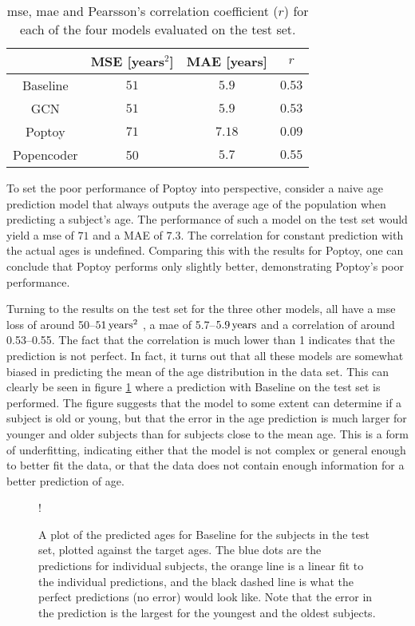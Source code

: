 \begin{table}[!htbp]
    \centering
    \caption{\acrfull{mse}, \acrfull{mae} and Pearsson's correlation coefficient ($r$) for each of the four models evaluated on the test set.}
    \begin{tabular}{c|c|c|c}
         &  MSE [years$^2$]& MAE [years] & $r$ \\ \hline 
        Baseline & $51 $& $5.9 $&$0.53 $\\
        GCN & $51 $& $5.9  $& $0.53 $\\
        Poptoy &$71 $ & $7.18 $ &$ 0.09 $\\
        Popencoder &50 & $5.7 $ & $0.55 $\\
    \end{tabular}
    \label{tab:age_final_model_results}
\end{table}

To set the poor performance of Poptoy into perspective, consider a naive age prediction model that always outputs the average age of the population when predicting a subject's age. The performance of such a model on the test set would yield a \acrshort{mse} of $71$ and a MAE of $7.3$. The correlation for constant prediction with the actual ages is undefined. Comparing this with the results for Poptoy, one can conclude that Poptoy performs only slightly better, demonstrating Poptoy's poor performance.

Turning to the results on the test set for the three other models, all have a \acrshort{mse} loss of around 50--$51\rm\,years^2$ , a \acrshort{mae} of 5.7--$5.9\rm\,years$ and a correlation of around 0.53--0.55. The fact that the correlation is much lower than 1 indicates that the prediction is not perfect. In fact, it turns out that all these models are somewhat biased in predicting the mean of the age distribution in the data set. This can clearly be seen in figure \cref{fig:age_regression} where a prediction with Baseline on the test set is performed. The figure suggests that the model to some extent can determine if a subject is old or young, but that the error in the age prediction is much larger for younger and older subjects than for subjects close to the mean age. This is a form of underfitting, indicating either that the model is not complex or general enough to better fit the data, or that the data does not contain enough information for a better prediction of age.

\begin{figure}[!htbp]
    \centering
    \begin{center}
        \resizebox {0.6\linewidth} {!} {
            
        }
    \end{center}
    \caption{A plot of the predicted ages for Baseline for the subjects in the test set, plotted against the target ages. The blue dots are the predictions for individual subjects, the orange line is a linear fit to the individual predictions, and the black dashed line is what the perfect predictions (no error) would look like. Note that the error in the prediction is the largest for the youngest and the oldest subjects.}
    \label{fig:age_regression}
\end{figure}


